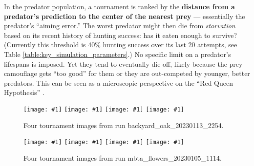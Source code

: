 \documentclass[letterpaper]{article}
\newcommand{\jargon}[1]{\textit{#1}}
\newcommand{\runID}{\footnotesize}
\newcommand{\igfour}[1]{\texttt{[image: \#1]}}
\begin{document}
\par
In the predator population, a tournament is ranked by the \textbf{distance from a predator's prediction to the center of the nearest prey} --- essentially the predator's “aiming error.” The worst predator might then die from \jargon{starvation} based on its recent history of hunting success: has it eaten enough to survive? (Currently this threshold is 40\% hunting success over its last 20 attempts, see Table \ref{table:key_simulation_parameters}.) No specific limit on a predator's lifespans is imposed. Yet they tend to eventually die off, likely because the prey camouflage gets “too good” for them or they are out-competed by younger, better predators. This can be seen as a microscopic perspective on the “Red Queen Hypothesis” \citep{van_valen_new_1973}.


\begin{figure}[t]
    \igfour{20230115_step_6902.png}
    \hfill
    \igfour{20230115_step_7682.png}
    \hfill
    \igfour{20230115_step_7942.png}
    \hfill
    \igfour{20230115_step_12413.png}
    \caption{Four tournament images from run {\runID backyard\_oak\_20230113\_2254}.}
    \label{fig:backyard_oak_4x}
\end{figure}

\begin{figure}[t]
    \igfour{20230106_step_11019.png}
    \hfill
    \igfour{20230106_step_11204.png}
    \hfill
    \igfour{20230106_step_11689.png}
    \hfill
    \igfour{20230106_step_11995.png}
    \caption{Four tournament images from run {\runID mbta\_flowers\_20230105\_1114}.}
    \label{fig:mbta_flowers_4x}
\end{figure}
\end{document}
